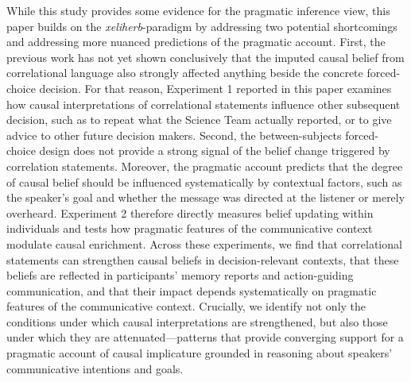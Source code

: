 \documentclass[10pt,letterpaper]{article}
\begin{document}
While this study provides some evidence for the pragmatic inference view, this paper builds on the \textit{xeliherb}-paradigm by addressing two potential shortcomings and addressing more nuanced predictions of the pragmatic account.
%
First, the previous work has not yet shown conclusively that the imputed causal belief from correlational language also strongly affected anything beside the concrete forced-choice decision. 
For that reason, Experiment 1 reported in this paper examines how causal interpretations of correlational statements influence other subsequent decision, such as to repeat what the Science Team actually reported, or to give advice to other future decision makers. 
%
Second, the between-subjects forced-choice design does not provide a strong signal of the belief change triggered by correlation statements.
%
Moreover, the pragmatic account predicts that the degree of causal belief should be influenced systematically by contextual factors, such as the speaker's goal and whether the message was directed at the listener or merely overheard.
Experiment 2 therefore directly measures belief updating within individuals and tests how pragmatic features of the communicative context modulate causal enrichment. 
Across these experiments, we find that correlational statements can strengthen causal beliefs in decision-relevant contexts, that these beliefs are reflected in participants’ memory reports and action-guiding communication, and that their impact depends systematically on pragmatic features of the communicative context. 
Crucially, we identify not only the conditions under which causal interpretations are strengthened, but also those under which they are attenuated—patterns that provide converging support for a pragmatic account of causal implicature grounded in reasoning about speakers’ communicative intentions and goals.
\end{document}
